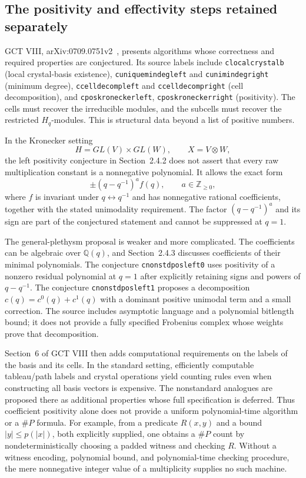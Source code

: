 \subsection{The positivity and effectivity steps retained separately}

GCT VIII, arXiv:0709.0751v2~\cite{mulmuley2008gct8}, presents algorithms whose correctness and
required properties are conjectured.  Its source labels include
\texttt{clocalcrystalb} (local crystal-basis existence),
\texttt{cuniquemindegleft} and \texttt{cunimindegright} (minimum degree),
\texttt{ccelldecompleft} and \texttt{ccelldecompright} (cell decomposition),
and \texttt{cposkroneckerleft}, \texttt{cposkroneckerright} (positivity).
The cells must recover the irreducible modules, and the subcells must
recover the restricted $H_q$-modules.  This is structural data beyond a
list of positive numbers.

In the Kronecker setting
\[
 H=GL(V)\times GL(W),\qquad X=V\otimes W,
\]
the left positivity conjecture in Section~2.4.2 does not assert that
every raw multiplication constant is a nonnegative polynomial.  It allows
the exact form
\begin{equation}\label{eq:gct-nrh-signed-positivity}
 \pm(q-q^{-1})^a f(q),\qquad a\in\mathbb Z_{\ge0},
\end{equation}
where $f$ is invariant under $q\leftrightarrow q^{-1}$ and has
nonnegative rational coefficients, together with the stated unimodality
requirement.  The factor $(q-q^{-1})^a$ and its sign are part of the
conjectured statement and cannot be suppressed at $q=1$.

The general-plethysm proposal is weaker and more complicated.  The
coefficients can be algebraic over $\mathbb Q(q)$, and Section~2.4.3
discusses coefficients of their minimal polynomials.  The conjecture
\texttt{cnonstdposleft0} uses positivity of a nonzero residual polynomial
at $q=1$ after explicitly retaining signs and powers of $q-q^{-1}$.
The conjecture \texttt{cnonstdposleft1} proposes a decomposition
$c(q)=c^0(q)+c^1(q)$ with a dominant positive unimodal term and a small
correction.  The source includes asymptotic language and a polynomial
bitlength bound; it does not provide a fully specified Frobenius complex
whose weights prove that decomposition.

Section~6 of GCT VIII then adds computational requirements on the labels
of the basis and its cells.  In the standard setting, efficiently
computable tableau/path labels and crystal operations yield counting
rules even when constructing all basis vectors is expensive.  The
nonstandard analogues are proposed there as additional properties whose
full specification is deferred.  Thus coefficient positivity alone
does not provide a uniform polynomial-time algorithm or a $\#P$ formula.
For example, from a predicate $R(x,y)$ and a bound $|y|\le p(|x|)$, both
explicitly supplied, one obtains a $\#P$ count by nondeterministically
choosing a padded witness and checking $R$.  Without a witness encoding,
polynomial bound, and polynomial-time checking procedure, the mere
nonnegative integer value of a multiplicity supplies no such machine.

